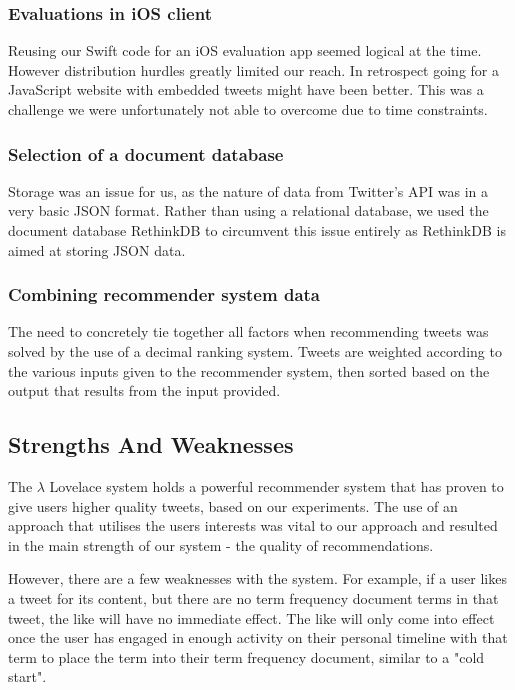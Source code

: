 \documentclass{article}
\begin{document}
\subsubsection*{Evaluations in iOS client} %
Reusing our Swift code for an iOS evaluation app seemed logical at the time. However distribution hurdles greatly limited our reach. In retrospect going for a JavaScript website with embedded tweets \cite{embed-tweet} might have been better. This was a challenge we were unfortunately not able to overcome due to time constraints.

\subsubsection*{Selection of a document database} %
Storage was an issue for us, as the nature of data from Twitter's API was in a very basic JSON format. Rather than using a relational database, we used the document database RethinkDB to circumvent this issue entirely as RethinkDB is aimed at storing JSON data.

\subsubsection*{Combining recommender system data} %
The need to concretely tie together all factors when recommending tweets was solved by the use of a decimal ranking system. Tweets are weighted according to the various inputs given to the recommender system, then sorted based on the output that results from the input provided.


\subsection{Strengths And Weaknesses} %
The $\lambda$ Lovelace system holds a powerful recommender system that has proven to give users higher quality tweets, based on our experiments. The use of an approach that utilises the users interests was vital to our approach and resulted in the main strength of our system - the quality of recommendations.

However, there are a few weaknesses with the system. For example, if a user likes a tweet for its content, but there are no term frequency document terms in that tweet, the like will have no immediate effect. The like will only come into effect once the user has engaged in enough activity on their personal timeline with that term to place the term into their term frequency document, similar to a "cold start". 
\end{document}
